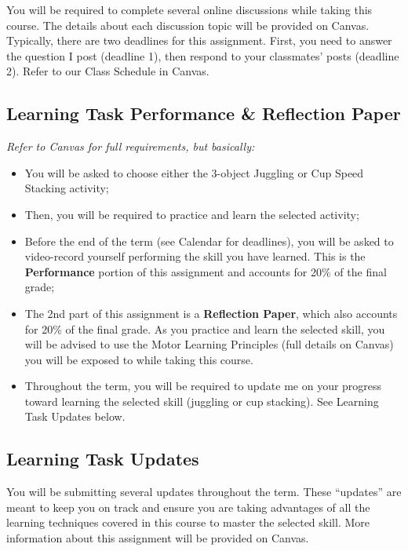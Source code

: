 \documentclass[11pt,]{article}
\providecommand{\tightlist}{%
  \setlength{\itemsep}{0pt}\setlength{\parskip}{0pt}}
\begin{document}
You will be required to complete several online discussions while taking
this course. The details about each discussion topic will be provided on
Canvas. Typically, there are two deadlines for this assignment. First,
you need to answer the question I post (deadline 1), then respond to
your classmates' posts (deadline 2). Refer to our Class Schedule in
Canvas.

\hypertarget{learning-task-performance-reflection-paper}{%
\subsection{Learning Task Performance \& Reflection
Paper}\label{learning-task-performance-reflection-paper}}

\emph{Refer to Canvas for full requirements, but basically:}

\begin{itemize}
\tightlist
\item
  You will be asked to choose either the 3-object Juggling or Cup Speed
  Stacking activity;
\item
  Then, you will be required to practice and learn the selected
  activity;
\item
  Before the end of the term (see Calendar for deadlines), you will be
  asked to video-record yourself performing the skill you have learned.
  This is the \textbf{Performance} portion of this assignment and
  accounts for 20\% of the final grade;
\item
  The 2nd part of this assignment is a \textbf{Reflection Paper}, which
  also accounts for 20\% of the final grade. As you practice and learn
  the selected skill, you will be advised to use the Motor Learning
  Principles (full details on Canvas) you will be exposed to while
  taking this course.
\item
  Throughout the term, you will be required to update me on your
  progress toward learning the selected skill (juggling or cup
  stacking). See Learning Task Updates below.
\end{itemize}

\hypertarget{learning-task-updates}{%
\subsection{Learning Task Updates}\label{learning-task-updates}}

You will be submitting several updates throughout the term. These
``updates'' are meant to keep you on track and ensure you are taking
advantages of all the learning techniques covered in this course to
master the selected skill. More information about this assignment will
be provided on Canvas.
\end{document}
